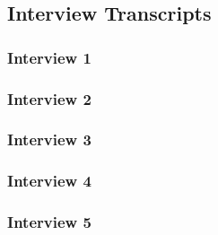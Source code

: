\documentclass{article}
\begin{document}
 \subsection{Interview Transcripts}
 \subsubsection{Interview 1}
 \subsubsection{Interview 2}
 \subsubsection{Interview 3}
 \subsubsection{Interview 4}
 \subsubsection{Interview 5}
 
\end{document}
